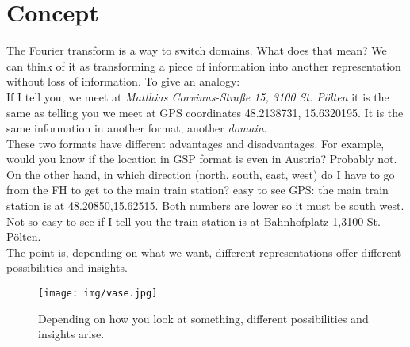 











\section{Concept}
The Fourier transform is a way to switch domains. What does that mean? We can think of it as transforming a piece of information into another representation without loss of information. To give an analogy: \\
If I tell you, we meet at \textit{Matthias Corvinus-Straße 15, 3100 St. Pölten} it is the same as telling you we meet at GPS coordinates 48.2138731, 15.6320195. It is the same information in another format, another \textit{domain}.\\
These two formats have different advantages and disadvantages. For example, would you know if the location in GSP format is even in Austria? Probably not. On the other hand, in which direction (north, south, east, west) do I have to go from the FH to get to the main train station? easy to see GPS: the main train station is at 48.20850,15.62515. Both numbers are lower so it must be south west. Not so easy to see if I tell you the train station is at Bahnhofplatz 1,3100 St. Pölten. \\
The point is, depending on what we want, different representations offer different possibilities and insights.
\begin{figure}[H]
	\centering
	\texttt{[image: img/vase.jpg]}
	\caption[illusion]
	{Depending on how you look at something, different possibilities and insights arise.}
	\label{fig:vase}
\end{figure}

